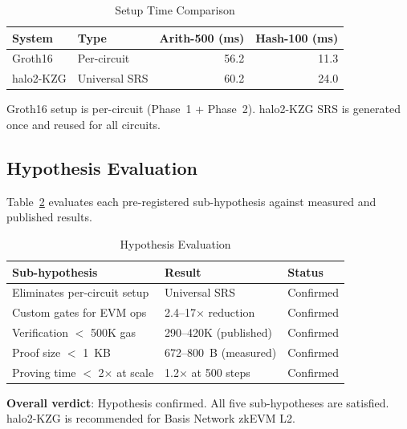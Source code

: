 \begin{table}[htbp]
\caption{Setup Time Comparison}
\label{tab:setup}
\centering
\begin{tabular}{@{}llrr@{}}
\toprule
\textbf{System} & \textbf{Type} & \textbf{Arith-500 (ms)} & \textbf{Hash-100 (ms)} \\
\midrule
Groth16   & Per-circuit & 56.2 & 11.3 \\
halo2-KZG & Universal SRS & 60.2 & 24.0 \\
\bottomrule
\end{tabular}
\begin{flushleft}
\footnotesize Groth16 setup is per-circuit (Phase~1 + Phase~2).
halo2-KZG SRS is generated once and reused for all circuits.
\end{flushleft}
\end{table}

\subsection{Hypothesis Evaluation}

Table~\ref{tab:hypothesis} evaluates each pre-registered
sub-hypothesis against measured and published results.

\begin{table}[htbp]
\caption{Hypothesis Evaluation}
\label{tab:hypothesis}
\centering
\begin{tabular}{@{}p{4.2cm}ll@{}}
\toprule
\textbf{Sub-hypothesis} & \textbf{Result} & \textbf{Status} \\
\midrule
Eliminates per-circuit setup & Universal SRS & Confirmed \\
Custom gates for EVM ops & 2.4--17$\times$ reduction & Confirmed \\
Verification $<$ 500K gas & 290--420K (published) & Confirmed \\
Proof size $<$ 1~KB & 672--800~B (measured) & Confirmed \\
Proving time $<$ 2$\times$ at scale & 1.2$\times$ at 500 steps & Confirmed \\
\bottomrule
\end{tabular}
\end{table}

\textbf{Overall verdict}: Hypothesis confirmed. All five
sub-hypotheses are satisfied. halo2-KZG is recommended for
Basis Network zkEVM L2.
